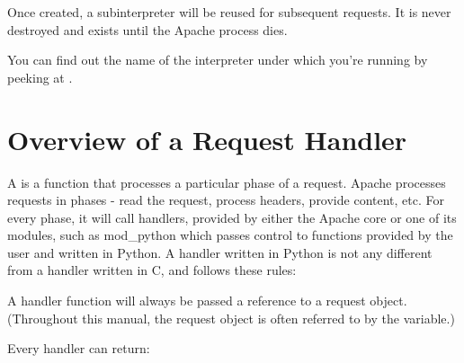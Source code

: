 Once created, a subinterpreter will be reused for subsequent requests.
It is never destroyed and exists until the Apache process dies.

You can find out the name of the interpreter under which you're
running by peeking at .

\begin{seealso}
\end{seealso}

\section{Overview of a Request Handler\label{pyapi-handler}}

A  is a function that processes a particular phase of a
request. Apache processes requests in phases - read the request,
process headers, provide content, etc. For every phase, it will call
handlers, provided by either the Apache core or one of its modules,
such as mod_python which passes control to functions provided by the
user and written in Python. A handler written in Python is not any
different from a handler written in C, and follows these rules:

  A handler function will always
be passed a reference to a request object. (Throughout this manual,
the request object is often referred to by the  variable.)

Every handler can return:

